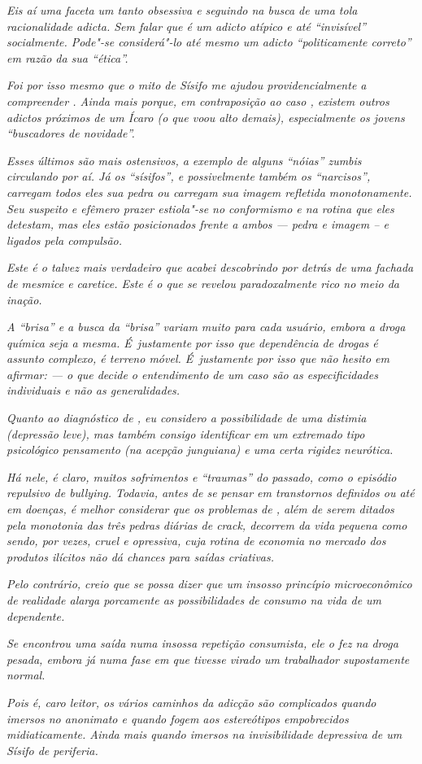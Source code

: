 \emph{Eis aí uma faceta um tanto obsessiva e seguindo na busca de uma
tola racionalidade adicta. Sem falar que  é um adicto atípico e até
``invisível'' socialmente. Pode"-se considerá"-lo até mesmo um adicto
``politicamente correto'' em razão da sua ``ética''.}~

\emph{Foi por isso mesmo que o mito de Sísifo me ajudou
providencialmente a compreender . Ainda mais porque, em contraposição
ao caso , existem outros adictos próximos de um Ícaro (o que voou alto
demais), especialmente os jovens ``buscadores de novidade''.}~

\emph{Esses últimos são mais ostensivos, a exemplo de alguns ``nóias''
zumbis circulando por aí. Já os ``sísifos'', e possivelmente também os
``narcisos'', carregam todos eles sua pedra ou carregam sua imagem
refletida monotonamente. Seu suspeito e efêmero prazer estiola"-se no
conformismo e na rotina que eles detestam, mas eles estão posicionados
frente a ambos --- pedra e imagem -- e ligados pela compulsão.}~

\emph{Este é o  talvez mais verdadeiro que acabei descobrindo por
detrás de uma fachada de mesmice e caretice. Este é o  que se revelou
paradoxalmente rico no meio da inação.}~

\emph{A ``brisa'' e a busca da ``brisa'' variam muito para cada usuário,
embora a droga química seja a mesma. É~justamente por isso que
dependência de drogas é assunto complexo, é terreno móvel. É~justamente
por isso que não hesito em afirmar: --- o que decide o entendimento de
um caso são as especificidades individuais e não as generalidades.}~

\emph{Quanto ao diagnóstico de , eu considero a possibilidade de uma
distimia (depressão leve), mas também consigo identificar em  um
extremado tipo psicológico pensamento (na acepção junguiana) e uma certa
rigidez neurótica.}~

\emph{Há nele, é claro, muitos sofrimentos e ``traumas'' do passado,
como o episódio repulsivo de bullying. Todavia, antes de se pensar em
transtornos definidos ou até em doenças, é melhor considerar que os
problemas de , além de serem ditados pela monotonia das três pedras
diárias de crack, decorrem da vida pequena como sendo, por vezes, cruel
e opressiva, cuja rotina de economia no mercado dos produtos ilícitos
não dá chances para saídas criativas.}~

\emph{Pelo contrário, creio que se possa dizer que um insosso princípio
microeconômico de realidade alarga porcamente as possibilidades de
consumo na vida de um dependente.}~

\emph{Se  encontrou uma saída numa insossa repetição consumista, ele o
fez na droga pesada, embora já numa fase em que tivesse virado um
trabalhador supostamente normal.}~

\emph{Pois é, caro leitor, os vários caminhos da adicção são complicados
quando imersos no anonimato e quando fogem aos estereótipos empobrecidos
midiaticamente. Ainda mais quando imersos na invisibilidade depressiva
de um Sísifo de periferia.}
